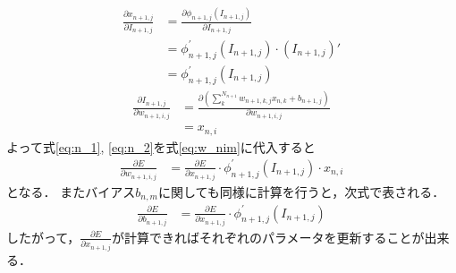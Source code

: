     \begin{align}
      \frac{\partial x_{n+1, j}}{\partial I_{n+1, j}} &= \frac{\partial \phi_{n+1, j}(I_{n+1, j})}{\partial I_{n+1, j}} \nonumber \\
          &= \phi_{n+1, j}^{'}(I_{n+1, j}) \cdot (I_{n+1, j})' \nonumber \\
          &= \phi_{n+1, j}^{'}(I_{n+1, j})
          \label{eq:n_1}
    \end{align}
    \begin{align}
      \frac{\partial I_{n+1, j}}{\partial w_{n+1, i, j}} &= \frac{\partial \left( \sum_{k}^{N_{n+1}}w_{n+1, k, j}x_{n, k} + b_{n+1, j}\right)}{\partial w_{n+1, i, j}} \nonumber \\
      &= x_{n, i}
          \label{eq:n_2}
    \end{align}
    よって式\ref{eq:n_1}, \ref{eq:n_2}を式\ref{eq:w_nim}に代入すると
    \begin{align}
      \frac{\partial E}{\partial w_{n+1, i, j}} &= \frac{\partial E}{\partial x_{n+1, j}} \cdot \phi_{n+1, j}^{'}(I_{n+1, j}) \cdot x_{n, i} \label{eq:ew_n1ij}
    \end{align}
    となる．
    またバイアス$b_{n, m}$に関しても同様に計算を行うと，次式で表される．
    \begin{align}
      \frac{\partial E}{\partial b_{n+1, j}} &= \frac{\partial E}{\partial x_{n+1, j}} \cdot \phi_{n+1, j}^{'}(I_{n+1, j})
    \end{align}
    したがって，$\frac{\partial E}{\partial x_{n+1, j}}$が計算できればそれぞれのパラメータを更新することが出来る．
    
